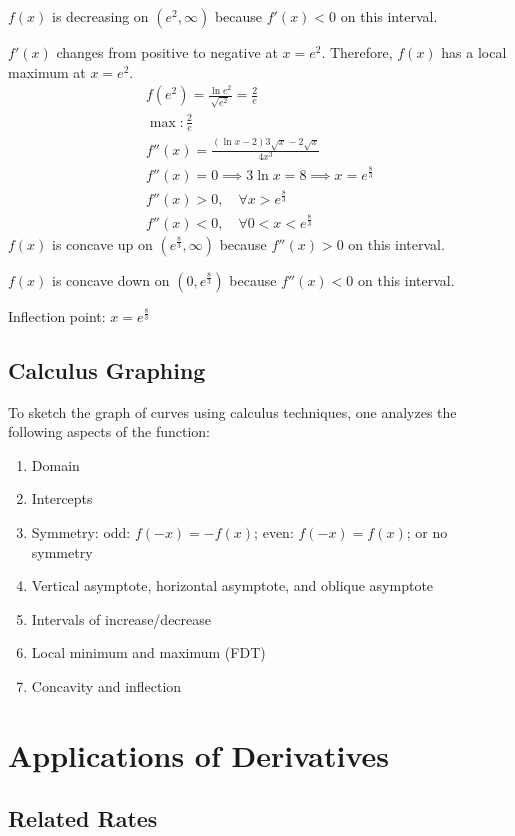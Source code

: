 \documentclass{article}
\newcommand{\vem}{\vspace{0.5em}}
\begin{document}
$f(x)$ is decreasing on $(e^2, \infty)$ because $f'(x)<0$ on this interval. \vem

$f'(x)$ changes from positive to negative at $x=e^2$. Therefore, $f(x)$ has a local maximum at $x=e^2$.
\begin{gather*}
    f(e^2)=\frac{\ln e^2}{\sqrt{e^2}}=\frac{2}{e}\\
    \boxed{\max: \frac{2}{e}}\\
    f''(x)=\frac{(\ln x-2)3\sqrt{x}-2\sqrt{x}}{4x^3}\\
    f''(x)=0 \implies 3\ln x = 8 \implies x= e^{\frac{8}{3}}\\
    f''(x)>0, \quad \forall x > e^{\frac{8}{3}}\\
    f''(x)<0, \quad \forall 0 <x < e^{\frac{8}{3}}
\end{gather*}
$f(x)$ is concave up on $(e^{\frac{8}{3}}, \infty)$ because $f''(x)>0$ on this interval. \vem

$f(x)$ is concave down on $(0, e^{\frac{8}{3}})$ because $f''(x)<0$ on this interval. \vem

Inflection point: $\boxed{x=e^{\frac{8}{3}}}$ \vem

\subsection{Calculus Graphing}
To sketch the graph of curves using calculus techniques, one analyzes the following aspects of the function:
\begin{enumerate}
    \item Domain
    \item Intercepts
    \item Symmetry: odd: $f(-x)=-f(x)$; even: $f(-x)=f(x)$; or no symmetry
    \item Vertical asymptote, horizontal asymptote, and oblique asymptote
    \item Intervals of increase/decrease
    \item Local minimum and maximum (FDT)
    \item Concavity and inflection
\end{enumerate}

\section{Applications of Derivatives}

\subsection{Related Rates}
\end{document}
